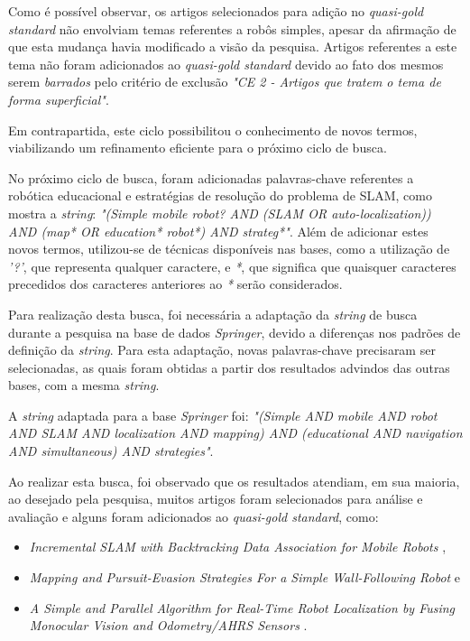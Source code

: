 		Como é possível observar, os artigos selecionados para adição no \textit{quasi-gold standard} não envolviam temas referentes a robôs simples, apesar da afirmação de que esta mudança havia modificado a visão da pesquisa. Artigos referentes a este tema não foram adicionados ao \textit{quasi-gold standard} devido ao fato dos mesmos serem \textit{barrados} pelo critério de exclusão \textit{"CE 2 - Artigos que tratem o tema de forma superficial"}. 

		Em contrapartida, este ciclo possibilitou o conhecimento de novos termos, viabilizando um refinamento eficiente para o próximo ciclo de busca.

		No próximo ciclo de busca, foram adicionadas palavras-chave referentes a robótica educacional e estratégias de resolução do problema de SLAM, como mostra a \textit{string}: \textit{"(Simple mobile robot? AND (SLAM OR auto-localization)) AND (map* OR education* robot*) AND strateg*"}. Além de adicionar estes novos termos, utilizou-se de técnicas disponíveis nas bases, como a utilização de \textit{'?'}, que representa qualquer caractere, e \textit{*}, que significa que quaisquer caracteres precedidos dos caracteres anteriores ao \textit{*} serão considerados.

		Para realização desta busca, foi necessária a adaptação da \textit{string} de busca durante a pesquisa na base de dados \textit{Springer}, devido a diferenças nos padrões de definição da \textit{string}. Para esta adaptação, novas palavras-chave precisaram ser selecionadas, as quais foram obtidas a partir dos resultados advindos das outras bases, com a mesma \textit{string}.

		A \textit{string} adaptada para a base \textit{Springer} foi: \textit{"(Simple AND mobile AND robot AND SLAM AND localization AND mapping) AND (educational AND navigation AND simultaneous) AND strategies"}.

		Ao realizar esta busca, foi observado que os resultados atendiam, em sua maioria, ao desejado pela pesquisa, muitos artigos foram selecionados para análise e avaliação e alguns foram adicionados ao \textit{quasi-gold standard}, como:

			\begin{itemize}
				\item \textit{Incremental SLAM with Backtracking Data Association for Mobile Robots} \cite{incrementalSLAM},
				\item \textit{Mapping and Pursuit-Evasion Strategies For a Simple Wall-Following Robot} \cite{wall_following} e
				\item \textit{A Simple and Parallel Algorithm for Real-Time Robot Localization by Fusing Monocular Vision and Odometry/AHRS Sensors} \cite{fusingSensorsParallel}.
			\end{itemize}

